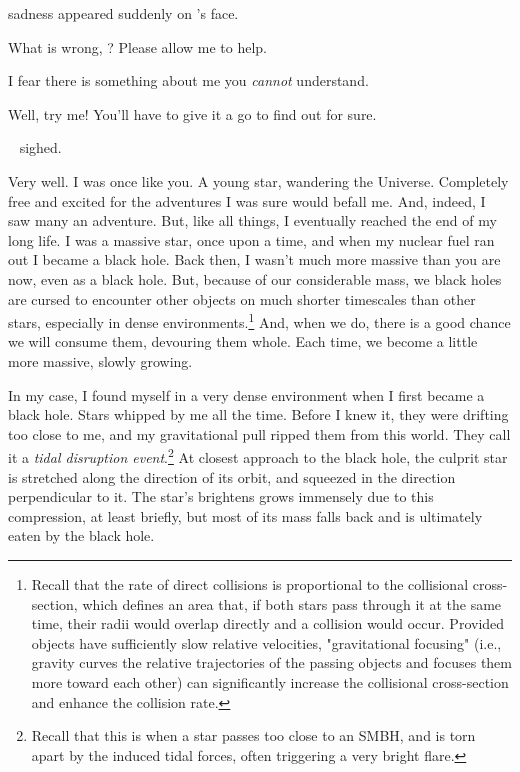 \documentclass[main.tex]{subfiles}
\begin{document}
\par \nar sadness appeared suddenly on \rmchiron's face.

\par \Electra What is wrong, \rmchiron?  Please allow me to help.

\par \Chiron I fear there is something about me you \textit{cannot} understand.

\par \Electra Well, try me!  You'll have to give it a go to find out for sure.

\par \nar \rmchiron~ sighed.

\par \Chiron Very well.  I was once like you.  A young star, wandering the Universe.  Completely free and excited for the adventures I was sure would befall me.  And, indeed, I saw many an adventure.  But, like all things, I eventually reached the end of my long life.  I was a massive star, once upon a time, and when my nuclear fuel ran out I became a black hole.  Back then, I wasn't much more massive than you are now, even as a black hole.  But, because of our considerable mass, we black holes are cursed to encounter other objects on much shorter timescales than other stars, especially in dense environments.\footnote{Recall that the rate of direct collisions is proportional to the collisional cross-section, which defines an area that, if both stars pass through it at the same time, their radii would overlap directly and a collision would occur.  Provided objects have sufficiently slow relative velocities, "gravitational focusing" (i.e., gravity curves the relative trajectories of the passing objects and focuses them more toward each other) can significantly increase the collisional cross-section and enhance the collision rate.}  And, when we do, there is a good chance we will consume them, devouring them whole.  Each time, we become a little more massive, slowly growing.  

\par \Chiron In my case, I found myself in a very dense environment when I first became a black hole.  Stars whipped by me all the time.  Before I knew it, they were drifting too close to me, and my gravitational pull ripped them from this world.  They call it a \textit{tidal disruption event}.\footnote{Recall that this is when a star passes too close to an SMBH, and is torn apart by the induced tidal forces, often triggering a very bright flare.}  At closest approach to the black hole, the culprit star is stretched along the direction of its orbit, and squeezed in the direction perpendicular to it.  The star's brightens grows immensely due to this compression, at least briefly, but most of its mass falls back and is ultimately eaten by the black hole.  
\end{document}
